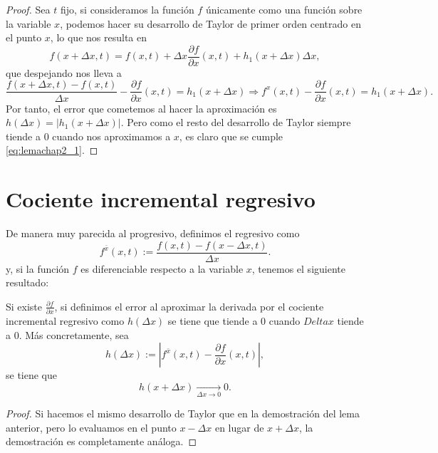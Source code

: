 \begin{proof}
	Sea $t$ fijo, si consideramos la función $f$ únicamente como una función sobre la variable $x$, podemos hacer su desarrollo de Taylor de primer orden centrado en el punto $x$, lo que nos resulta en
	\begin{equation}
		f(x+\Delta x,t) = f(x,t) + \Delta x\frac{\partial f}{\partial x}(x,t) + h_1(x+\Delta x)\Delta x, 
	\end{equation}
	que despejando nos lleva a
	\begin{equation}
		\frac{f(x+\Delta x,t) - f(x,t)}{\Delta x} - \frac{\partial f}{\partial x}(x,t) = h_1(x+\Delta x) \Rightarrow f^{x}(x,t) - \frac{\partial f}{\partial x}(x,t) = h_1(x+\Delta x).
	\end{equation}
	Por tanto, el error que cometemos al hacer la aproximación es $h(\Delta x) = |h_1(x+\Delta x)|$. Pero como el resto del desarrollo de Taylor siempre tiende a 0 cuando nos aproximamos a $x$, es claro que se cumple \eqref{eq:lemachap2_1}.
\end{proof}

\section{Cociente incremental regresivo}
De manera muy parecida al progresivo, definimos el regresivo como
\begin{equation}
	\label{eq:not_back}
	f^{\bar{x}}(x,t) := \frac{f(x,t)-f(x-\Delta x,t)}{\Delta x}.
\end{equation}
y, si la función $f$ es diferenciable respecto a la variable $x$, tenemos el siguiente resultado:

\begin{lema}\label{lema:error_reg}
	Si existe $\frac{\partial f}{\partial x}$, si definimos el error al aproximar la derivada por el cociente incremental regresivo como $h(\Delta x)$ se tiene que tiende a 0 cuando $Delta x$ tiende a 0. Más concretamente, sea
	\begin{equation}
		h(\Delta x) := \left| f^{\bar{x}}(x,t) - \frac{\partial f}{\partial x}(x,t) \right| ,
	\end{equation}
	se tiene que
	\begin{equation}\label{eq:lemachap2_2}
		h(x+\Delta x) \xrightarrow[\Delta x\longrightarrow 0]{} 0.
	\end{equation}
\end{lema}

\begin{proof}
	Si hacemos el mismo desarrollo de Taylor que en la demostración del lema anterior, pero lo evaluamos en el punto $x-\Delta x$ en lugar de $x+\Delta x$, la demostración es completamente análoga.
\end{proof}

